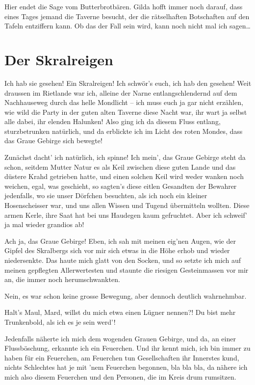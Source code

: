 \documentclass[10pt, a4paper, oneside]{book}
\begin{document}
Hier endet die Sage vom Butterbrotbären. Gilda hofft immer noch darauf, dass eines Tages jemand die Taverne besucht, der die rätselhaften Botschaften auf den Tafeln entziffern kann. Ob das der Fall sein wird, kann noch nicht mal ich sagen…



\newpage
\section{Der Skralreigen}


Ich hab sie gesehen! Ein Skralreigen! Ich schwör’s euch, ich hab den gesehen! Weit draussen im Rietlande war ich, alleine der Narne entlangschlendernd auf dem Nachhauseweg durch das helle Mondlicht – ich muss euch ja gar nicht erzählen, wie wild die Party in der guten alten Taverne diese Nacht war, ihr wart ja selbst alle dabei, ihr elenden Halunken! Also ging ich da diesem Fluss entlang, sturzbetrunken natürlich, und da erblickte ich im Licht des roten Mondes, dass das Graue Gebirge sich bewegte!

Zunächst dacht’ ich natürlich, ich spinne! Ich mein’, das Graue Gebirge steht da schon, seitdem Mutter Natur es als Keil zwischen diese guten Lande und das düstere Krahd getrieben hatte, und einen solchen Keil wird weder wanken noch weichen, egal, was geschieht, so sagten’s diese eitlen Gesandten der Bewahrer jedenfalls, wo sie unser Dörfchen besuchten, als ich noch ein kleiner Hosenscheisser war, und uns allen Wissen und Tugend übermitteln wollten. Diese armen Kerle, ihre Saat hat bei uns Haudegen kaum gefruchtet. Aber ich schweif’ ja mal wieder grandios ab!

Ach ja, das Graue Gebirge! Eben, ich sah mit meinen eig'nen Augen, wie der Gipfel des Skralbergs sich vor mir sich etwas in die Höhe erhob und wieder niedersenkte. Das haute mich glatt von den Socken, und so setzte ich mich auf meinen gepflegten Allerwertesten und staunte die riesigen Gesteinmassen vor mir an, die immer noch herumschwankten.

Nein, es war schon keine grosse Bewegung, aber dennoch deutlich wahrnehmbar.

Halt’s Maul, Mard, willst du mich etwa einen Lügner nennen?! Du bist mehr Trunkenbold, als ich es je sein werd’!

Jedenfalls näherte ich mich dem wogenden Grauen Gebirge, und da, an einer Flussböschung, erkannte ich ein Feuerchen. Und ihr kennt mich, ich bin immer zu haben für ein Feuerchen, am Feuerchen tun Gesellschaften ihr Innerstes kund, nichts Schlechtes hat je mit ’nem Feuerchen begonnen, bla bla bla, da nähere ich mich also diesem Feuerchen und den Personen, die im Kreis drum rumsitzen.
\end{document}

